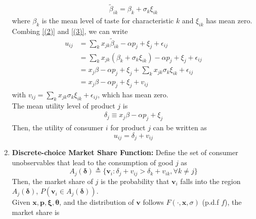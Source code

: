 \documentclass[11pt]{elegantbook}
\begin{document}
\begin{enumerate}
    \begin{equation}
        \begin{aligned}
            \tilde{\beta}_{ik}=\beta_k+\sigma_k\xi_{ik}
        \end{aligned}
        \tag{(3)}
        \label{(3)}
    \end{equation}
    where $\beta_k$ is the mean level of taste for characteristic $k$ and $\xi_{ik}$ has mean zero.\\
    Combing \ref{(2)} and \ref{(3)}, we can write
    \begin{equation}
        \begin{aligned}
            u_{ij}&=\sum_{k}x_{jk}\tilde{\beta}_{ik}-\alpha p_j+\xi_j+\epsilon_{ij}\\
            &=\sum_{k}x_{jk}\left(\beta_k+\sigma_k\xi_{ik}\right)-\alpha p_j+\xi_j+\epsilon_{ij}\\
            &=x_j\beta-\alpha p_j+\xi_j+\sum_{k}x_{jk}\sigma_k\xi_{ik}+\epsilon_{ij}\\
            &=x_j\beta-\alpha p_j+\xi_j+v_{ij}
        \end{aligned}
        \nonumber
    \end{equation}
    with $v_{ij}=\sum_{k}x_{jk}\sigma_k\xi_{ik}+\epsilon_{ij}$, which has mean zero.\\
    The mean utility level of product $j$ is
    \begin{equation}
        \begin{aligned}
            \delta_j\equiv x_j\beta-\alpha p_j+\xi_j
        \end{aligned}
        \tag{(5)}
        \label{(5)}
    \end{equation}
    Then, the utility of consumer $i$ for product $j$ can be written as $$u_{ij}=\delta_j+v_{ij}$$
    \item \textbf{Discrete-choice Market Share Function:}
    \subitem Define the set of consumer unobservables that lead to the consumption of good $j$ as $$A_j(\boldsymbol{\delta})\triangleq \{\boldsymbol{v}_i: \delta_j+v_{ij}>\delta_k+v_{ik}, \forall k\neq j\}$$
    Then, the market share of $j$ is the probability that $\boldsymbol{v}_i$ falls into the region $A_j(\boldsymbol{\delta})$, $P(\boldsymbol{v}_i\in A_j(\boldsymbol{\delta}))$.\\
    Given $\boldsymbol{x},\boldsymbol{p},\boldsymbol{\xi}, \boldsymbol{\theta}$, and the distribution of $\boldsymbol{v}$ follows $F(\cdot,\boldsymbol{x},\sigma)$ (p.d.f $f$), the market share is
    \begin{equation}

\end{equation}
\end{enumerate}
\end{document}

